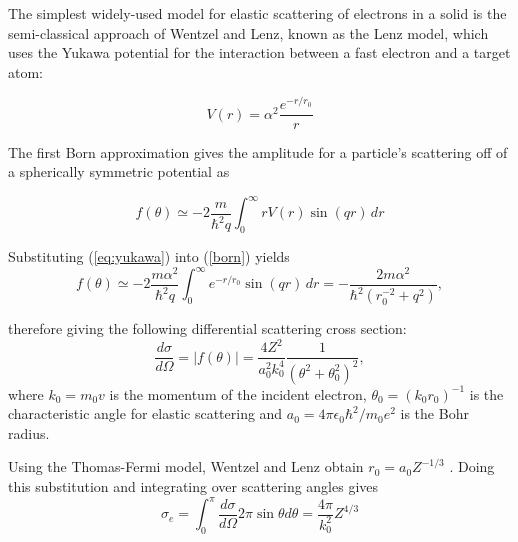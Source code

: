 \documentclass [11pt, proquest, article] {uwthesis}[2016/11/22]
\begin{document}
The simplest widely-used model for elastic scattering of electrons in a solid is the semi-classical approach of Wentzel and Lenz, known as the Lenz model, which uses the Yukawa potential for the interaction between a fast electron and a target atom:

\begin{equation}\label{eq:yukawa} 
V(r) = \alpha^2 \frac{e^{-r/r_0}}{r}
\end{equation}


The first Born approximation gives the amplitude for a particle's scattering off of a spherically symmetric potential as

 \begin{equation}\label{born}
	f(\theta) \simeq -2 \frac{m}{\hbar^2 q} \int_0^\infty r V(r) \sin (qr)\, dr
\end{equation}

Substituting (\ref{eq:yukawa}) into (\ref{born}) yields 
\begin{equation}
	f(\theta) \simeq -2 \frac{m \alpha^2}{\hbar^2 q} \int_0^\infty e^{-r/r_0} \sin (qr)\, dr = -\frac{2m\alpha^2}{\hbar^2 (r_0^{-2} + q^2)},
\end{equation}

therefore giving the following differential scattering cross section:
$$
\frac{d\sigma}{d\Omega} = |f(\theta)| = \frac{4 Z^2}{a_0^2 k_0^4} \frac{1}{(\theta^2 + \theta_0^2)^2},
$$
where $k_0 = m_0 v$ is the momentum of the incident electron, $\theta_0 = (k_0 r_0)^{-1}$ is the characteristic angle for elastic scattering and $a_0 = 4 \pi \epsilon_0 \hbar^2/m_0 e^2$ is the Bohr radius.

Using the Thomas-Fermi model, Wentzel and Lenz obtain $r_0 = a_0 Z^{-1/3}$ . Doing this substitution and integrating over scattering angles gives
\begin{equation}
\sigma_e = \int_0^\pi \frac{d\sigma}{d\Omega} 2 \pi \sin \theta d \theta = \frac{4 \pi}{k_0^2} Z^{4/3}
\end{equation}
\end{document}
